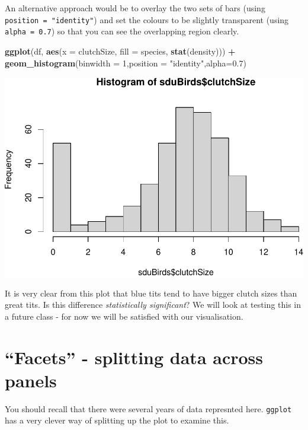 \documentclass[
  a4paperpaper,
]{book}
\newenvironment{Shaded}{\begin{snugshade}}{\end{snugshade}}
\newcommand{\DataTypeTok}[1]{\textcolor[rgb]{0.13,0.29,0.53}{#1}}
\newcommand{\DecValTok}[1]{\textcolor[rgb]{0.00,0.00,0.81}{#1}}
\newcommand{\FloatTok}[1]{\textcolor[rgb]{0.00,0.00,0.81}{#1}}
\newcommand{\KeywordTok}[1]{\textcolor[rgb]{0.13,0.29,0.53}{\textbf{#1}}}
\newcommand{\NormalTok}[1]{#1}
\newcommand{\OperatorTok}[1]{\textcolor[rgb]{0.81,0.36,0.00}{\textbf{#1}}}
\newcommand{\StringTok}[1]{\textcolor[rgb]{0.31,0.60,0.02}{#1}}
\begin{document}
An alternative approach would be to overlay the two sets of bars (using \texttt{position\ =\ "identity"}) and set the colours to be slightly transparent (using \texttt{alpha\ =\ 0.7}) so that you can see the overlapping region clearly.

\begin{Shaded}
\begin{Highlighting}[]
\KeywordTok{ggplot}\NormalTok{(df, }\KeywordTok{aes}\NormalTok{(}\DataTypeTok{x =}\NormalTok{ clutchSize, }\DataTypeTok{fill =}\NormalTok{ species, }\KeywordTok{stat}\NormalTok{(density))) }\OperatorTok{+}
\StringTok{  }\KeywordTok{geom\_histogram}\NormalTok{(}\DataTypeTok{binwidth =} \DecValTok{1}\NormalTok{,}\DataTypeTok{position =} \StringTok{"identity"}\NormalTok{,}\DataTypeTok{alpha=}\FloatTok{0.7}\NormalTok{)}
\end{Highlighting}
\end{Shaded}

\includegraphics{BB852_files/figure-latex/unnamed-chunk-76-1.pdf}

It is very clear from this plot that blue tits tend to have bigger clutch sizes than great tits. Is this difference \emph{statistically significant}? We will look at testing this in a future class - for now we will be satisfied with our visualisation.

\hypertarget{facets---splitting-data-across-panels}{%
\section{``Facets'' - splitting data across panels}\label{facets---splitting-data-across-panels}}

You should recall that there were several years of data represnted here.
\texttt{ggplot} has a very clever way of splitting up the plot to examine this.
\end{document}
